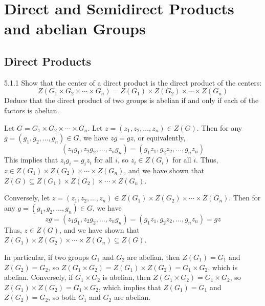 \section{Direct and Semidirect Products and abelian Groups}

\subsection{Direct Products}

\begin{exercise}{5.1.1}
    Show that the center of a direct product is the direct product of the centers:
    \[
    	Z(G_1 \times G_2 \times \cdots \times G_n) = Z(G_1) \times Z(G_2) \times \cdots \times Z(G_n)
    \]
    Deduce that the direct product of two groups is abelian if and only if each of the factors is abelian.
\end{exercise}

\begin{sol}
    Let $G = G_1 \times G_2 \times \cdots \times G_n$.
	Let $z = (z_1, z_2, \ldots, z_n) \in Z(G)$.
	Then for any $g = (g_1, g_2, \ldots, g_n) \in G$, we have $zg = gz$, or equivalently,
    \[
    	(z_1g_1, z_2g_2, \ldots, z_ng_n) = (g_1z_1, g_2z_2, \ldots, g_nz_n)
    \]
    This implies that $z_i g_i = g_i z_i$ for all $i$, so $z_i \in Z(G_i)$ for all $i$.
	Thus, $z \in Z(G_1) \times Z(G_2) \times \cdots \times Z(G_n)$, and we have shown that $Z(G) \subseteq Z(G_1) \times Z(G_2) \times \cdots \times Z(G_n)$.

    Conversely, let $z = (z_1, z_2, \ldots, z_n) \in Z(G_1) \times Z(G_2) \times \cdots \times Z(G_n)$.
	Then for any $g = (g_1, g_2, \ldots, g_n) \in G$, we have
    \[
    	zg = (z_1g_1, z_2g_2, \ldots, z_ng_n) = (g_1z_1, g_2z_2, \ldots, g_nz_n) = gz
    \]
    Thus, $z \in Z(G)$, and we have shown that $Z(G_1) \times Z(G_2) \times \cdots \times Z(G_n) \subseteq Z(G)$.

    In particular, if two groups $G_1$ and $G_2$ are abelian, then $Z(G_1) = G_1$ and $Z(G_2) = G_2$, so $Z(G_1 \times G_2) = Z(G_1) \times Z(G_2) = G_1 \times G_2$, which is abelian.
    Conversely, if $G_1 \times G_2$ is abelian, then $Z(G_1 \times G_2) = G_1 \times G_2$, so $Z(G_1) \times Z(G_2) = G_1 \times G_2$, which implies that $Z(G_1) = G_1$ and $Z(G_2) = G_2$, so both $G_1$ and $G_2$ are abelian.
\end{sol}

